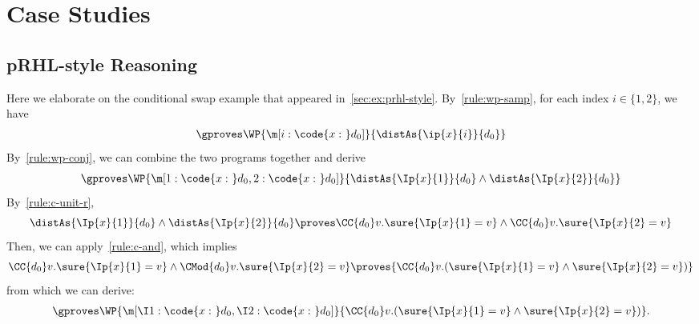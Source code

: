 \section{Case Studies}
\label{sec:appendix:examples}


\subsection{pRHL-style Reasoning}
\label{sec:appendix:ex:prhl}

Here we elaborate on the conditional swap example that appeared in~\cref{sec:ex:prhl-style}.
By~\cref{rule:wp-samp}, for each index $i \in \{1, 2\}$, we have
\begin{align*}
  \gproves \WP{\m[i: \code{x:~}d_0]}{\distAs{\ip{x}{i}}{d_0}}
\end{align*}
By~\cref{rule:wp-conj}, we can combine the two programs together and derive
\begin{align*}
  \gproves \WP{\m[1: \code{x:~}d_0, 2: \code{x:~}d_0]}{\distAs{\Ip{x}{1}}{d_0} \land \distAs{\Ip{x}{2}}{d_0}}
\end{align*}
By~\cref{rule:c-unit-r},
\[\distAs{\Ip{x}{1}}{d_0} \land \distAs{\Ip{x}{2}}{d_0} \proves
  \CC{d_0} v. \sure{\Ip{x}{1} = v} \land  \CC{d_0} v. \sure{\Ip{x}{2} = v}
\]
Then, we can apply~\cref{rule:c-and}, which implies
\[
  \CC{d_0} v. \sure{\Ip{x}{1} = v} \land  \CMod{d_0} v. \sure{\Ip{x}{2} = v}
  \proves
  {\CC{d_0} v. (\sure{\Ip{x}{1} = v} \land  \sure{\Ip{x}{2} = v})}
\]
from which we can derive:
\begin{align*}
  \gproves \WP{\m[\I1: \code{x:~}d_0, \I2: \code{x:~}d_0]}{\CC{d_0} v.(\sure{\Ip{x}{1}=v} \land \sure{\Ip{x}{2}=v})}.
\end{align*}

